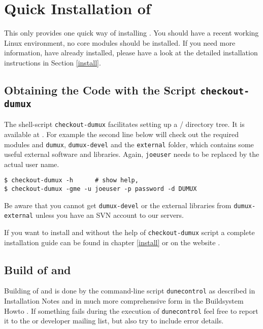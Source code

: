 \section{Quick Installation of \Dumux} \label{quick-install}

This only provides one quick way of installing \Dumux. 
You should have a recent working Linux environment, no \Dune core modules should be installed. 
If you need more information, 
have \Dune already installed, please have a look at the detailed installation 
instructions in Section \ref{install}. 

\subsection{Obtaining the Code with the Script \texttt{checkout-dumux}}

The shell-script \texttt{checkout-dumux} facilitates setting up a {\Dune}/{\Dumux} directory tree.
It is available at \cite{DUMUX-DOWNLOAD}.
For example the second line below will check out the required \Dune modules and \texttt{dumux}, 
\texttt{dumux-devel} and the \texttt{external} folder, which contains some useful external software and libraries.
Again,  \texttt{joeuser} needs to be replaced by the actual user name.
\begin{lstlisting}[style=Bash]
$ checkout-dumux -h      # show help,
$ checkout-dumux -gme -u joeuser -p password -d DUMUX 
\end{lstlisting}

Be aware that you cannot get \texttt{dumux-devel} or the external libraries from \texttt{dumux-external} unless
you have an SVN account to our servers.

If you want to install \Dune and \Dumux without the help of \texttt{checkout-dumux} script a complete installation
guide can be found in chapter \ref{install} or on the \Dune website \cite{DUNE-INST}.

\subsection{Build of \Dune and \Dumux}
\label{buildIt}
Building of \Dune and \Dumux is done by the command-line script \texttt{dunecontrol} as described in \Dune Installation Notes \cite{DUNE-INST}
and in much more comprehensive form in the \Dune Buildsystem Howto \cite{DUNE-BS}.
If something fails during the execution of \texttt{dunecontrol} feel free to report it to the \Dune or \Dumux developer mailing list,
but also try to include error details.

